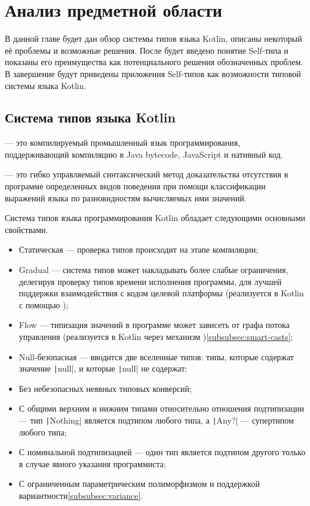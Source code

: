 \section{Анализ предметной области}

В данной главе будет дан обзор системы типов языка Kotlin, описаны некоторый её проблемы и возможные решения.
После будет введено понятие Self-типа и показаны его преимущества как потенциального решения обозначенных проблем.
В завершение будут приведены приложения Self-типов как возможности типовой системы языка Kotlin.

\subsection{Система типов языка Kotlin}

\begin{definition}
     --- это компилируемый промышленный язык программирования, поддерживающий компиляцию в Java bytecode, JavaScript и нативный код\cite{jemerov2017kotlin}.
\end{definition}

\begin{definition}
     --- это гибко управляемый синтаксический метод доказательства отсутствия в программе определенных видов поведения при помощи классификации выражений языка по разновидностям вычисляемых ими значений\cite{pierce2002types}.
\end{definition}

Система типов языка программирования Kotlin обладает следующими основными свойствами\cite{akhin2021kotlin}.
\begin{itemize}
    \item Статическая --- проверка типов происходит на этапе компиляции;
    \item Gradual --- система типов может накладывать более слабые ограничения, делегируя проверку типов времени исполнения программы, для лучшей поддержки взаимодействия с кодом целевой платформы (реализуется в Kotlin с помощью )\cite{siek2007gradual};
    \item Flow --- типизация значений в программе может зависеть от графа потока управления (реализуется в Kotlin через механизм )\cite{pearce2013calculus}\ref{subsubsec:smart-casts};
    \item Null-безопасная --- вводится две вселенные типов: типы, которые содержат значение \texttt|null|, и которые \texttt|null| не содержат;
    \item Без небезопасных неявных типовых конверсий;
    \item С общими верхним и нижним типами относительно отношения подтипизации --- тип \texttt|Nothing| является подтипом любого типа, а \texttt|Any?| --- супертипом любого типа;
    \item С номинальной подтипизацией --- один тип является подтипом другого только в случае явного указания программиста;
    \item С ограниченным параметрическим полиморфизмом и поддержкой вариантности\ref{subsubsec:variance}.
\end{itemize}

